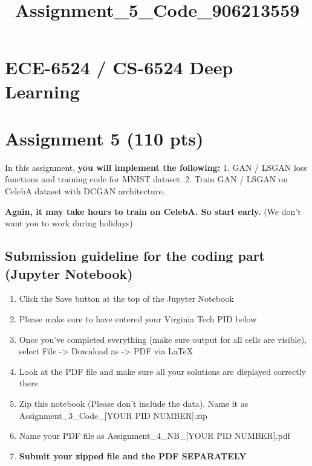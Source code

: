 \documentclass[11pt]{article}
\title{Assignment\_5\_Code\_906213559}
\providecommand{\tightlist}{%
      \setlength{\itemsep}{0pt}\setlength{\parskip}{0pt}}
\begin{document}
    
    \maketitle
    
    

    
    \hypertarget{ece-6524-cs-6524-deep-learning}{%
\section{ECE-6524 / CS-6524 Deep
Learning}\label{ece-6524-cs-6524-deep-learning}}

\hypertarget{assignment-5-110-pts}{%
\section{Assignment 5 (110 pts)}\label{assignment-5-110-pts}}

In this assignment, \textbf{you will implement the following:} 1. GAN /
LSGAN loss functions and training code for MNIST dataset. 2. Train GAN /
LSGAN on CelebA dataset with DCGAN architecture.

\textbf{{Again, it may take hours to train on CelebA. So start early.}}
(We don't want you to work during holidays)

\hypertarget{submission-guideline-for-the-coding-part-jupyter-notebook}{%
\subsection{Submission guideline for the coding part (Jupyter
Notebook)}\label{submission-guideline-for-the-coding-part-jupyter-notebook}}

\begin{enumerate}
\def\labelenumi{\arabic{enumi}.}
\tightlist
\item
  Click the Save button at the top of the Jupyter Notebook
\item
  Please make sure to have entered your Virginia Tech PID below
\item
  Once you've completed everything (make sure output for all cells are
  visible), select File -\textgreater{} Download as -\textgreater{} PDF
  via LaTeX
\item
  Look at the PDF file and make sure all your solutions are displayed
  correctly there
\item
  Zip this notebook (Please don't include the data). Name it as
  Assignment\_3\_Code\_{[}YOUR PID NUMBER{]}.zip
\item
  Name your PDF file as Assignment\_4\_NB\_{[}YOUR PID NUMBER{]}.pdf
\item
  \textbf{ Submit your zipped file and the PDF SEPARATELY}
\end{enumerate}
\end{document}
